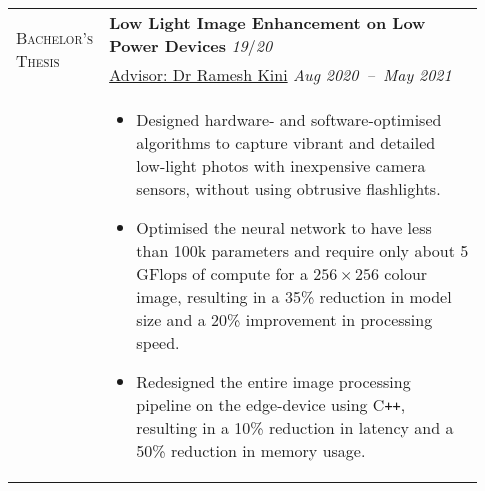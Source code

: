 \documentclass[letterpaper, 10pt, oneside]{article}
\newcommand{\stitle}[1]{\normalsize{\textsc{#1}}}
\newcommand{\bdit}[1]{{\textbf{#1}}}
\begin{document}
\begin{longtable}{@{} p{0.13\linewidth} p{0.8\linewidth}}
    \multirow{2}{6.5em}{\stitle{Bachelor's Thesis}}   & \bdit{Low Light Image Enhancement on Low Power Devices} \hfill \textsl{19}/\textsl{20}                                                                                                                \\
                                                      & \href{https://ece.nitk.ac.in/faculty/ramesh-kini-m}{Advisor: Dr Ramesh Kini} \hfill \textsl{Aug 2020\ --\ May 2021}                                                                                   \\
                                                      & \parbox{0.8\textwidth}{                                                                                                                                                                               %
        \begin{itemize}[leftmargin=*, itemsep=-0.70ex, topsep=-0.88ex]
            \item Designed hardware- and software-optimised algorithms to capture vibrant and detailed low-light photos with inexpensive camera sensors, without using obtrusive flashlights.
            \item Optimised the neural network to have less than 100k parameters and require only about 5 GFlops of compute for a $256 \times 256$ colour image, resulting in a 35\% reduction in model size and a 20\% improvement in processing speed.
            \item Redesigned the entire image processing pipeline on the edge-device using C\texttt{++}, resulting in a 10\% reduction in latency and a 50\% reduction in memory usage.
        \end{itemize}
    }
    \\
    \\


\end{longtable}
\end{document}
